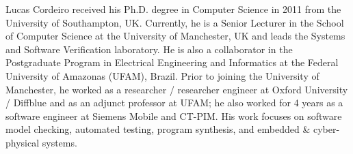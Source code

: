 \documentclass[journal]{IEEEtran}
\begin{document}
%
%
\begin{IEEEbiography}
    {Lucas Cordeiro}
received his Ph.D. degree in Computer Science in 2011 from the University of Southampton, UK. Currently, he is a Senior Lecturer in the School of Computer Science at the University of Manchester, UK and leads the Systems and Software Verification laboratory. He is also a collaborator in the Postgraduate Program in Electrical Engineering and Informatics at the Federal University of Amazonas (UFAM), Brazil. Prior to joining the University of Manchester, he worked as a researcher / researcher engineer at Oxford University / Diffblue and as an adjunct professor at UFAM; he also worked for 4 years as a software engineer at Siemens Mobile and CT-PIM. His work focuses on software model checking, automated testing, program synthesis, and embedded \& cyber-physical systems.
\end{IEEEbiography}








\end{document}

